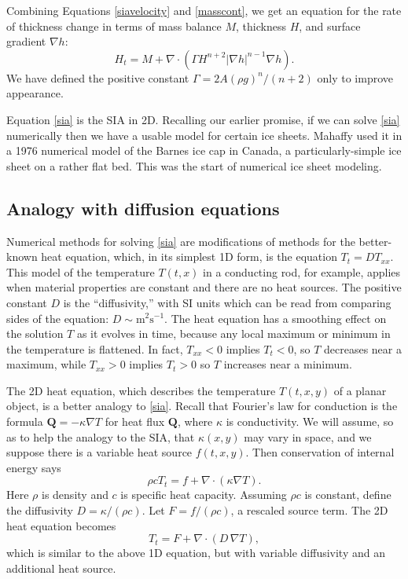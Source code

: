 \documentclass[letterpaper,final,12pt,reqno]{amsart}
\newcommand{\grad}{\nabla}
\newcommand{\Div}{\nabla\cdot}
\begin{document}
Combining Equations \eqref{siavelocity} and \eqref{masscont}, we get an equation for the rate of thickness change in terms of mass balance $M$, thickness $H$, and surface gradient $\grad h$:
\begin{equation}
H_t = M + \Div \left(\Gamma H^{n+2} |\grad h|^{n-1} \grad h \right). \label{sia}
\end{equation}
We have defined the positive constant $\Gamma = 2 A (\rho g)^n / (n+2)$ only to improve appearance.

Equation \eqref{sia} is the SIA in 2D.  Recalling our earlier promise, if we can solve \eqref{sia} numerically then we have a usable model for certain ice sheets.  Mahaffy \cite{Mahaffy} used it in a 1976 numerical model of the Barnes ice cap in Canada, a particularly-simple ice sheet on a rather flat bed.  This was the start of numerical ice sheet modeling.

\subsection*{Analogy with diffusion equations}  Numerical methods for solving \eqref{sia} are modifications of methods for the better-known heat equation, which, in its simplest 1D form, is the equation $T_t = D T_{xx}$.  This model of the temperature $T(t,x)$ in a conducting rod, for example, applies when material properties are constant and there are no heat sources.  The positive constant $D$ is the ``diffusivity,'' with SI units which can be read from comparing sides of the equation: $D\sim \text{m}^2 \text{s}^{-1}$.  The heat equation has a smoothing effect on the solution $T$ as it evolves in time, because any local maximum or minimum in the temperature is flattened.  In fact, $T_{xx}<0$ implies $T_t<0$, so $T$ decreases near a maximum, while $T_{xx}>0$ implies $T_t>0$ so $T$ increases near a minimum.

The 2D heat equation, which describes the temperature $T(t,x,y)$ of a planar object, is a better analogy to \eqref{sia}.  Recall that Fourier's law for conduction is the formula $\mathbf{Q} = - \kappa \grad T$ for heat flux $\mathbf{Q}$, where $\kappa$ is conductivity.  We will assume, so as to help the analogy to the SIA, that $\kappa(x,y)$ may vary in space, and we suppose there is a variable heat source $f(t,x,y)$.  Then conservation of internal energy says
\begin{equation}
\rho c T_t = f + \Div (\kappa \grad T). \label{heatearly}
\end{equation}
Here $\rho$ is density and $c$ is specific heat capacity.  Assuming $\rho c$ is constant, define the diffusivity $D=\kappa/(\rho c)$.  Let $F = f/(\rho c)$, a rescaled source term.  The 2D heat equation becomes
\begin{equation}
T_t = F + \Div (D\, \grad T), \label{heat}
\end{equation}
which is similar to the above 1D equation, but with variable diffusivity and an additional heat source.
\end{document}
